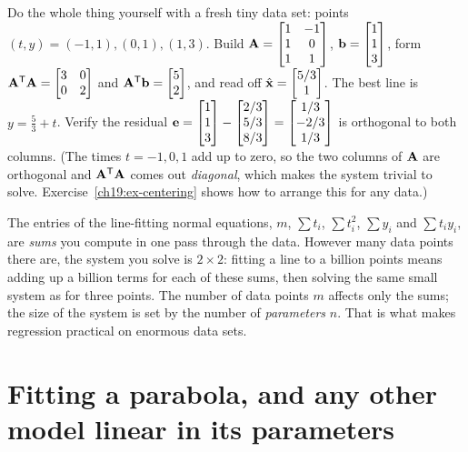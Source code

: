 \begin{labbox}
Do the whole thing yourself with a fresh tiny data set: points $(t,y)=(-1,1),(0,1),(1,3)$. Build
$\mathbf{A}=\begin{bmatrix}1&-1\\1&0\\1&1\end{bmatrix}$, $\mathbf{b}=\begin{bmatrix}1\\1\\3\end{bmatrix}$, form
$\mathbf{A}^{\mathsf{T}}\mathbf{A}=\begin{bmatrix}3&0\\0&2\end{bmatrix}$ and $\mathbf{A}^{\mathsf{T}}\mathbf{b}=\begin{bmatrix}5\\2\end{bmatrix}$, and
read off $\hat{\mathbf{x}}=\begin{bmatrix}5/3\\1\end{bmatrix}$. The best line is $y=\tfrac53 + t$. Verify the residual
$\mathbf{e}=\begin{bmatrix}1\\1\\3\end{bmatrix}-\begin{bmatrix}2/3\\5/3\\8/3\end{bmatrix}=\begin{bmatrix}1/3\\-2/3\\1/3\end{bmatrix}$ is orthogonal to both
columns. (The times $t=-1,0,1$ add up to zero, so the two columns of $\mathbf{A}$ are orthogonal and
$\mathbf{A}^{\mathsf{T}}\mathbf{A}$ comes out \emph{diagonal}, which makes the system trivial to solve.
Exercise~\ref{ch19:ex-centering} shows how to arrange this for any data.)
\end{labbox}

\begin{aestheticbox}
The entries of the line-fitting normal equations, $m$, $\sum t_i$, $\sum t_i^2$, $\sum y_i$ and
$\sum t_iy_i$, are \emph{sums} you compute in one pass through the data. However many data points
there are, the system you solve is $2\times2$: fitting a line to a billion points means adding up a
billion terms for each of these sums, then solving the same small system as for three points. The
number of data points $m$ affects only the sums; the size of the system is set by the number of
\emph{parameters} $n$. That is what makes regression practical on enormous data sets.
\end{aestheticbox}

\section{Fitting a parabola, and any other model linear in its parameters}

